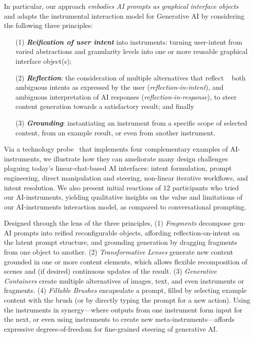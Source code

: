 In particular, our approach \textit{embodies AI prompts as graphical interface objects} and adapts the instrumental interaction model for Generative AI by considering the following three principles: 

\begin{enumerate}[label={(\arabic*)}]
    \item [(1)] \textit{\textbf{Reification of user intent}} into instruments: turning user-intent from varied abstractions and granularity levels into one or more reusable graphical interface object(s);
    \item  [(2)] \textit{\textbf{Reflection}}: the consideration of multiple alternatives that reflect ~\cite{DesignReflectiveConversation1992} both ambiguous intents as expressed by the user (\textit{reflection-in-intent}), and ambiguous interpretation of AI responses (\textit{reflection-in-response}), to steer content generation towards a satisfactory result; and finally
    \item [(3)] \textit{\textbf{Grounding}}: instantiating an instrument from a specific scope of selected content, from an example result, or even from another instrument.
\end{enumerate}

Via a technology probe~\cite{TechnologyProbesCHI2003} that implements four complementary examples of AI-instruments, we illustrate how they can ameliorate many design challenges plaguing today’s linear-chat-based AI interfaces: intent formulation, prompt engineering, direct manipulation and steering, non-linear iterative workflows, and intent resolution. We also present initial reactions of 12 participants who tried our AI-instruments, yielding qualitative insights on the value and limitations of our AI-instruments interaction model, as compared to conversational prompting. 



Designed through the lens of the three principles,  (1) \textit{Fragments} decompose gen-AI prompts into reified reconfigurable objects, affording reflection-on-intent on the latent prompt structure, and grounding generation by dragging fragments from one object to another. (2) \textit{Transformative Lenses} generate new content grounded in one or more content elements, which allows flexible recomposition of scenes and (if desired) continuous updates of the result. (3) \textit{Generative Containers} create multiple alternatives of images, text, and even instruments or fragments. 
(4) \textit{Fillable Brushes} encapsulate a prompt, filled by selecting example content with the brush (or by directly typing the prompt for a new action). Using the instruments in synergy---where outputs from one instrument form input for the next, or even using instruments to create new meta-instruments---affords expressive degrees-of-freedom for fine-grained steering of generative AI. 


